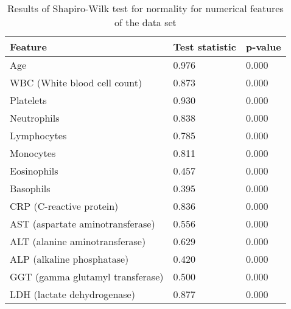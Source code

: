 \begin{table}
\begin{tabular}{lll}
Feature                          & Test statistic & p-value \\ \hline
Age                              & 0.976          & 0.000   \\
WBC (White blood cell count)     & 0.873          & 0.000   \\
Platelets                        & 0.930          & 0.000   \\
Neutrophils                      & 0.838          & 0.000   \\
Lymphocytes                      & 0.785          & 0.000   \\
Monocytes                        & 0.811          & 0.000   \\
Eosinophils                      & 0.457          & 0.000   \\
Basophils                        & 0.395          & 0.000   \\
CRP (C-reactive protein)         & 0.836          & 0.000   \\
AST (aspartate aminotransferase) & 0.556          & 0.000   \\
ALT (alanine aminotransferase)   & 0.629          & 0.000   \\
ALP (alkaline phosphatase)       & 0.420          & 0.000   \\
GGT (gamma glutamyl transferase) & 0.500          & 0.000   \\
LDH (lactate dehydrogenase)      & 0.877          & 0.000  
\end{tabular}
\caption{Results of Shapiro-Wilk test for normality for numerical features of 
the data set}
\label{tab:shapiro-wilk}
\end{table}
